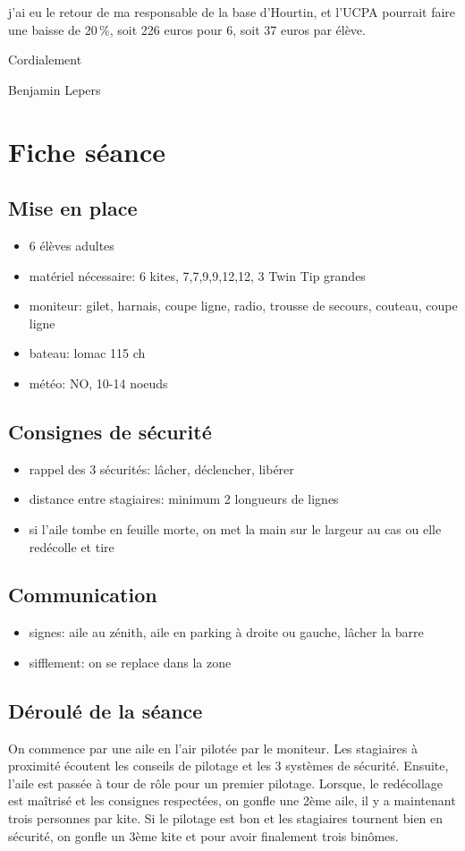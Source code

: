 \documentclass[11pt,a4paper]{report}
\begin{document}
j'ai eu le retour de ma responsable de la base d'Hourtin, et l'UCPA
pourrait faire une baisse de 20\,\%, soit 226 euros pour 6, soit 37 euros
par élève.

Cordialement

Benjamin Lepers
\chapter{Fiche séance\label{fiche_seance}}
\section{Mise en place}
\begin{itemize}
\item 6 élèves adultes
\item matériel nécessaire: 6 kites, 7,7,9,9,12,12, 3 Twin Tip grandes
\item moniteur: gilet, harnais, coupe ligne, radio, trousse de secours, couteau, coupe ligne
\item bateau: lomac 115 ch
\item météo: NO, 10-14 noeuds
\end{itemize}
\section{Consignes de sécurité}
\begin{itemize}
\item rappel des 3 sécurités: lâcher, déclencher, libérer
\item distance entre stagiaires: minimum 2 longueurs de lignes
\item si l'aile tombe en feuille morte, on met la main sur le largeur au cas ou elle redécolle et tire
\end{itemize}
\section{Communication}
\begin{itemize}
\item signes: aile au zénith, aile en parking à droite ou gauche, lâcher la barre
\item sifflement: on se replace dans la zone
\end{itemize}
\section{Déroulé de la séance}
On commence par une aile en l'air pilotée par le moniteur.
Les stagiaires à proximité écoutent les conseils de pilotage et les 3 systèmes
de sécurité.
Ensuite, l'aile est passée à tour de rôle pour un premier pilotage.
Lorsque, le redécollage est maîtrisé et les consignes respectées, 
on gonfle une 2ème aile, il y a maintenant trois personnes par kite.
Si le pilotage est bon et les stagiaires tournent bien en sécurité,
on gonfle un 3ème kite et pour avoir finalement trois binômes.
\end{document}
